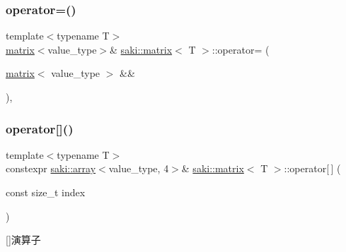 \mbox{\label{classsaki_1_1matrix_a06a7330daf074554dada53978e3ccd55}} 
\subsubsection{\texorpdfstring{operator=()}{operator=()}\hspace{0.1cm}{\footnotesize\ttfamily [2/2]}}
{\footnotesize\ttfamily template$<$typename T$>$ \\
\mbox{\hyperlink{classsaki_1_1matrix}{matrix}}$<$value\+\_\+type$>$\& \mbox{\hyperlink{classsaki_1_1matrix}{saki\+::matrix}}$<$ T $>$\+::operator= (\begin{DoxyParamCaption}\item[{\mbox{\hyperlink{classsaki_1_1matrix}{matrix}}$<$ value\+\_\+type $>$ \&\&}]{ }\end{DoxyParamCaption})\hspace{0.3cm}{\ttfamily [default]}, {\ttfamily [noexcept]}}

\mbox{\label{classsaki_1_1matrix_a9438f349876b7932a5c3c58a713e3e00}} 
\subsubsection{\texorpdfstring{operator[]()}{operator[]()}\hspace{0.1cm}{\footnotesize\ttfamily [1/2]}}
{\footnotesize\ttfamily template$<$typename T$>$ \\
constexpr \mbox{\hyperlink{classsaki_1_1array}{saki\+::array}}$<$value\+\_\+type, 4$>$\& \mbox{\hyperlink{classsaki_1_1matrix}{saki\+::matrix}}$<$ T $>$\+::operator\mbox{[}$\,$\mbox{]} (\begin{DoxyParamCaption}\item[{const size\+\_\+t}]{index }\end{DoxyParamCaption})\hspace{0.3cm}{\ttfamily [inline]}}



\mbox{[}\mbox{]}演算子 

\mbox{\label{classsaki_1_1matrix_a1a326fe310df8da04d32200dd6ae1e64}} 
